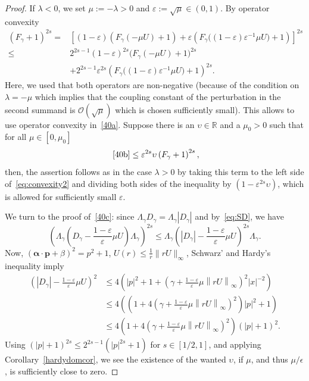 \documentclass[10pt]{amsart}
\theoremstyle{definition}
\newcommand*\rz{\mathbb{R}}
\newcommand*\cO{\mathcal{O}}
\newcommand*\balpha{\bm{\alpha}}
\newcommand*\bp{\bm{p}}
\begin{document}
\begin{proof}
If $\lambda<0$, we set $\mu:=-\lambda>0$ and $\varepsilon:=\sqrt\mu\in(0,1)$. By operator convexity
\begin{align}
\left(F_\gamma+1\right)^{2s} = &\left[(1-\varepsilon)\left(F_\gamma\left(-\mu U\right)+1\right) + \varepsilon\left(F_\gamma\big((1-\varepsilon)\varepsilon^{-1}\mu U\big)+1 \right)\right]^{2s}\label{eq:convexity2}\\
\leq &2^{2s-1}(1-\varepsilon)^{2s}\big(F_\gamma\left(-\mu U\right)+1\big)^{2s}\label{40a}\\
& + 2^{2s-1}\varepsilon^{2s}\left(F_\gamma\big((1-\varepsilon)\varepsilon^{-1}\mu U\big)+1\right)^{2s}.\label{40b}
\end{align}
Here, we used that both operators are non-negative (because of the condition on $\lambda=-\mu$ which implies that the coupling constant of the perturbation in the second summand is $\cO(\sqrt\mu)$ which is chosen sufficiently small). This allows to use operator convexity in~\eqref{40a}. Suppose there is an $\upsilon\in\rz$ and a $\mu_0>0$ such that for all $\mu\in[0,\mu_0]$
\begin{equation}\label{40c}
~\eqref{40b} \leq \varepsilon^{2s}\upsilon\left(F_\gamma+1\right)^{2s},
\end{equation}
then, the assertion follows as in the case $\lambda>0$ by taking this term to the left side of~\eqref{eq:convexity2} and dividing both sides of the inequality by $(1-\varepsilon^{2s}\upsilon)$, which is allowed for sufficiently small $\varepsilon$.

We turn to the proof of~\eqref{40c}: since $\Lambda_\gamma D_\gamma=\Lambda_\gamma|D_\gamma|$ and by~\eqref{eq:SD}, we have
\[
\left(\Lambda_\gamma\left(D_\gamma-\frac{1-\varepsilon}{\varepsilon}\mu U\right)\Lambda_\gamma\right)^{2s} \leq \Lambda_\gamma\left(\left|D_\gamma\right|-\frac{1-\varepsilon}{\varepsilon}\mu U\right)^{2s}\Lambda_\gamma.
\]
Now, $(\balpha\cdot\bp+\beta)^2=p^2+1$, $U(r)\leq\tfrac1r\|rU\|_\infty $, Schwarz' and Hardy's inequality imply
\begin{align*}
\left(\left|D_\gamma\right|-\frac{1-\varepsilon}{\varepsilon}\mu U\right)^2 & \leq 4\left(|p|^2+1+\left(\gamma+\frac{1-\varepsilon}{\varepsilon}\mu\left\|rU\right\|_\infty\right)^2|x|^{-2}\right)\\
& \leq 4\left(\left(1+4\left(\gamma+\frac{1-\varepsilon}{\varepsilon}\mu\left\|rU\right\|_\infty\right)^2\right)|p|^2+1\right)\\
& \leq 4\left(1+4\left(\gamma+\frac{1-\varepsilon}{\varepsilon}\mu\left\|rU\right\|_\infty\right)^2\right)\left(|p|+1\right)^2.
\end{align*}
Using $(|p|+1)^{2s}\leq2^{2s-1}(|p|^{2s}+1)$ for $s\in[1/2,1]$, and applying Corollary~\ref{hardydomcor}, we see the existence of the wanted $\upsilon$, if $\mu$, and thus $\mu/\epsilon$, is sufficiently close to zero.
\end{proof}
\end{document}
